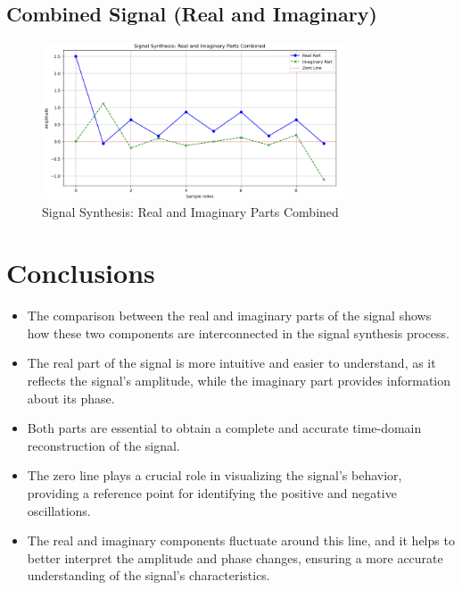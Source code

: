 \documentclass[12pt]{article}
\begin{document}
\subsection{Combined Signal (Real and Imaginary)}
\begin{figure}[htbp]
    \centering
    \includegraphics[width=0.8\textwidth]{3.png}
    \caption{Signal Synthesis: Real and Imaginary Parts Combined}
    \label{fig:combined_signal}
\end{figure}

\FloatBarrier
\vfill


\newpage

\section{Conclusions}

\begin{itemize}
    \item The comparison between the real and imaginary parts of the signal shows how these two components are interconnected in the signal synthesis process.
    \item The real part of the signal is more intuitive and easier to understand, as it reflects the signal's amplitude, while the imaginary part provides information about its phase.
    \item Both parts are essential to obtain a complete and accurate time-domain reconstruction of the signal.
    \item The zero line plays a crucial role in visualizing the signal's behavior, providing a reference point for identifying the positive and negative oscillations.
    \item The real and imaginary components fluctuate around this line, and it helps to better interpret the amplitude and phase changes, ensuring a more accurate understanding of the signal's characteristics.
\end{itemize}
\end{document}
